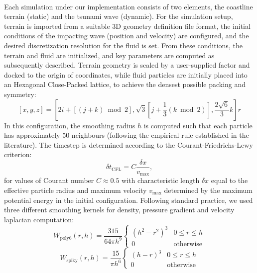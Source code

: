 \documentclass{llncs}
\begin{document}
\paragraph{} Each simulation under our implementation consists of two elements, the
coastline terrain (static) and the tsunami wave (dynamic). For the simulation setup,
terrain is imported from a suitable 3D geometry definition file format, the initial
conditions of the impacting wave (position and velocity) are configured, and the desired
discretization resolution for the fluid is set. From these conditions, the terrain and
fluid are initialized, and key parameters are computed as subsequently described. Terrain
geometry is scaled by a user-supplied factor and docked to the origin of coordinates,
while fluid particles are initially placed into an Hexagonal Close-Packed lattice, to
achieve the densest possible packing and symmetry:
\begin{equation}
  \label{eq:hcp}
  [x, y, z] = \left[ 2i+[(j+k) \bmod 2], \sqrt{3}[j + \frac{1}{3} (k \bmod 2)],
    \frac{2\sqrt{6}}{3} k \right] r
\end{equation}
In this configuration, the smoothing radius $h$ is computed such that each particle has
approximately 50 neighbours (following the empirical rule established in the
literature). The timestep is determined according to the Courant-Friedrichs-Lewy
criterion:
\begin{equation}
  \label{eq:cfl}
  \delta t_{\text{CFL}} = C \frac {\delta x}{v_{\text{max}}},
\end{equation}
for values of Courant number $C\approx0.5$ with characteristic length $\delta x$ equal to
the effective particle radius and maximum velocity $v_{\text{max}}$ determined by the
maximum potential energy in the initial configuration. Following standard practice, we
used three different smoothing kernels for density, pressure gradient and velocity
laplacian computation:
\begin{equation}
  \label{eq:poly6}
  W_{\text{poly6}}(r, h) = \frac{315}{64 \pi h^9}
  \begin{cases}
    (h^2 - r^2)^3 & 0 \leq r \leq h\\
    0 & \text{otherwise}
  \end{cases}
\end{equation}
\begin{equation}
  \label{eq:spiky}
  W_{\text{spiky}}(r, h) = \frac{15}{\pi h^6}
  \begin{cases}
    (h - r)^3 & 0 \leq r \leq h\\
    0 & \text{otherwise}
  \end{cases}
\end{equation}
\end{document}
